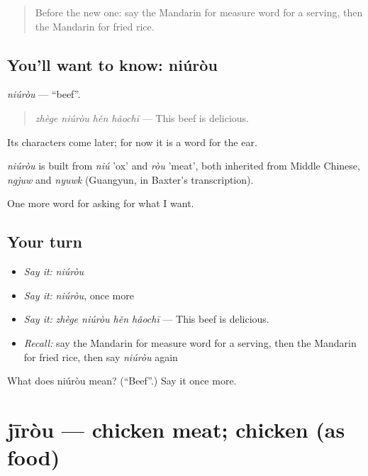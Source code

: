 \begin{quote}
Before the new one: say the Mandarin for measure word for a serving, then the Mandarin for fried rice.
\end{quote}

\subsection*{You'll want to know: niúròu}
\emph{niúròu} — \textquotedblleft{}beef\textquotedblright{}.

\begin{quote}
\emph{zhège niúròu hěn hǎochī} — This beef is delicious.
\end{quote}

Its characters come later; for now it is a word for the ear.

\begin{cousinweb}
\emph{niúròu} is built from \emph{niú} 'ox' and \emph{ròu} 'meat', both inherited from Middle Chinese, \emph{ngjuw} and \emph{nyuwk} (Guangyun, in Baxter's transcription).
\end{cousinweb}

\begin{grammarlens}[title={What you've built}]
One more word for asking for what I want.
\end{grammarlens}

\subsection*{Your turn}
\begin{itemize}
\raggedright
  \item \emph{Say it:} \emph{niúròu}
  \item \emph{Say it:} \emph{niúròu}, once more
  \item \emph{Say it:} \emph{zhège niúròu hěn hǎochī} — This beef is delicious.
  \item \emph{Recall:} say the Mandarin for measure word for a serving, then the Mandarin for fried rice, then say \emph{niúròu} again
\end{itemize}

\begin{tcolorbox}[breakable,colback=teal!4,colframe=teal!35!black,title={Before you move on}]
What does niúròu mean? (\textquotedblleft{}Beef\textquotedblright{}.) Say it once more.
\end{tcolorbox}
\section[jīròu]{jīròu — chicken meat; chicken (as food)}

